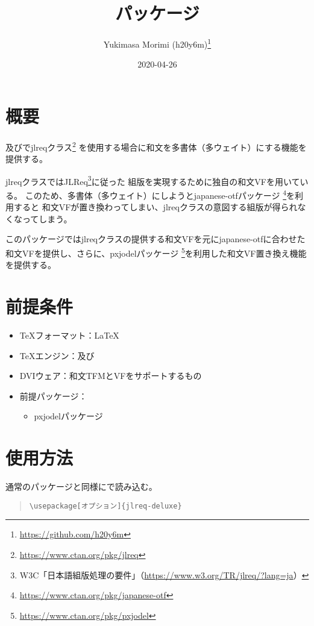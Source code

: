 \documentclass[dvipdfmx,a4paper]{jlreq}
\title{\pkg{jlreq-deluxe}パッケージ}
\author{Yukimasa Morimi (h20y6m)\thanks{\url{https://github.com/h20y6m}}}
\date{2020-04-26}
\newcommand{\pkg}[1]{\textsf{#1}}
\newcommand{\cls}[1]{\textsf{#1}}
\newcommand{\cmd}[1]{\eghostguarded{\texttt{\symbol{92}#1}}}
\begin{document}
\maketitle


\section{概要}

\pLaTeX 及び\upLaTeX で\cls{jlreq}クラス\footnote{\url{https://www.ctan.org/pkg/jlreq}}%
を使用する場合に和文を多書体（多ウェイト）にする機能を提供する。

\cls{jlreq}クラスではJLReq\footnote{W3C「日本語組版処理の要件」（\url{https://www.w3.org/TR/jlreq/?lang=ja}）}に従った
組版を実現するために独自の和文VFを用いている。
このため、多書体（多ウェイト）にしようと\pkg{japanese-otf}パッケージ
\footnote{\url{https://www.ctan.org/pkg/japanese-otf}}を利用すると
和文VFが置き換わってしまい、\pkg{jlreq}クラスの意図する組版が得られなくなってしまう。

このパッケージでは\cls{jlreq}クラスの提供する和文VFを元に\pkg{japanese-otf}に合わせた
和文VFを提供し、さらに、\pkg{pxjodel}パッケージ
\footnote{\url{https://www.ctan.org/pkg/pxjodel}}を利用した和文VF置き換え機能を提供する。


\section{前提条件}

\begin{itemize}
\item \TeX フォーマット：\LaTeX
\item \TeX エンジン：\pTeX 及び\upTeX
\item DVIウェア：和文TFMとVFをサポートするもの
\item 前提パッケージ：
  \begin{itemize}
  \item \pkg{pxjodel}パッケージ
  \end{itemize}
\end{itemize}


\section{使用方法}

通常のパッケージと同様に\cmd{usepackage}で読み込む。

\begin{quote}
\begin{verbatim}
\usepackage[オプション]{jlreq-deluxe}
\end{verbatim}
\end{quote}
\end{document}
